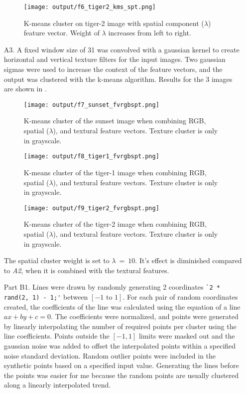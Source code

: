 \documentclass[12pt]{report}
\begin{document}
\begin{enumerate}
    \begin{figure}[H]
        \centering
        \texttt{[image: output/f6\_tiger2\_kms\_spt.png]}
        \caption{K-means cluster on tiger-2 image with spatial component ($\lambda$) feature vector. Weight of $\lambda$ increases from left to right.}
        \label{fig:Figure6}
    \end{figure}


    \item[A3.] A fixed window size of 31 was convolved with a gaussian kernel to create horizontal and vertical texture filters for the input images. Two gaussian sigmas were 
    used to increase the context of the feature vectors, and the output was clustered with the k-means algorithm. Results for the 3 images are shown in 
    .

    \begin{figure}[H]
        \centering
        \texttt{[image: output/f7\_sunset\_fvrgbspt.png]}
        \caption{K-means cluster of the sunset image when combining RGB, spatial ($\lambda$), and textural feature vectors. Texture cluster is only in grayscale.}
        \label{fig:Figure7}
    \end{figure}

    \begin{figure}[H]
        \centering
        \texttt{[image: output/f8\_tiger1\_fvrgbspt.png]}
        \caption{K-means cluster of the tiger-1 image when combining RGB, spatial ($\lambda$), and textural feature vectors. Texture cluster is only in grayscale.}
        \label{fig:Figure8}
    \end{figure}

    \begin{figure}[H]
        \centering
        \texttt{[image: output/f9\_tiger2\_fvrgbspt.png]}
        \caption{K-means cluster of the tiger-2 image when combining RGB, spatial ($\lambda$), and textural feature vectors. Texture cluster is only in grayscale.}
        \label{fig:Figure9}
    \end{figure}

    The spatial cluster weight is set to $\lambda \ = \ 10$. It's effect is diminished compared to \textit{A2}, when it is combined with the textural features.

    \item[Part B1.] Lines were drawn by randomly generating 2 coordinates \verb|`2 * rand(2, 1) - 1;'| between $[-1 \text{ to } 1]$. For each pair of random coordinates created, 
    the coefficients of the line was calculated using the equation of a line $ax + by + c = 0$. The coefficients were normalized, and points were generated by linearly interpolating 
    the number of required points per cluster using the line coefficients. Points outside the $[-1,1]$ limits were masked out and the gaussian noise was added to offset the 
    interpolated points within a specified noise standard deviation. Random outlier points were included in the synthetic points based on a specified input value. Generating the 
    lines before the points was easier for me because the random points are usually clustered along a linearly interpolated trend.


\end{enumerate}
\end{document}
